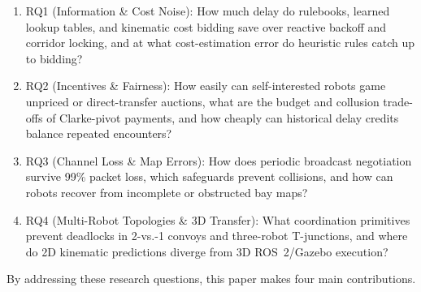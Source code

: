 \begin{enumerate}
\item RQ1 (Information \& Cost Noise): How much delay do rulebooks, learned lookup tables, and kinematic cost bidding save over reactive backoff and corridor locking, and at what cost-estimation error do heuristic rules catch up to bidding?

\item RQ2 (Incentives \& Fairness): How easily can self-interested robots game unpriced or direct-transfer auctions, what are the budget and collusion trade-offs of Clarke-pivot payments, and how cheaply can historical delay credits balance repeated encounters?

\item RQ3 (Channel Loss \& Map Errors): How does periodic broadcast negotiation survive 99\% packet loss, which safeguards prevent collisions, and how can robots recover from incomplete or obstructed bay maps?

\item RQ4 (Multi-Robot Topologies \& 3D Transfer): What coordination primitives prevent deadlocks in 2-vs.-1 convoys and three-robot T-junctions, and where do 2D kinematic predictions diverge from 3D ROS~2/Gazebo execution?
\end{enumerate}

By addressing these research questions, this paper makes four main contributions.

